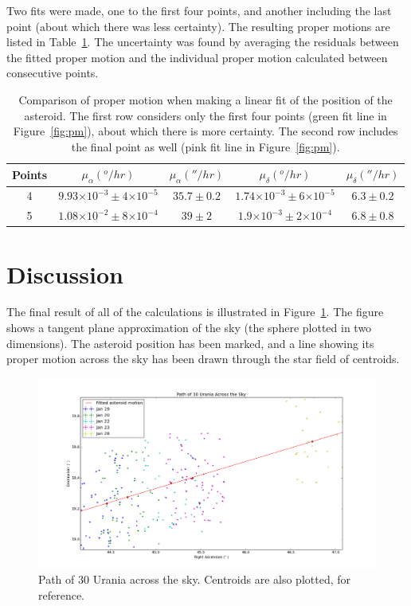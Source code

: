 \documentclass[a4paper,12pt]{article}
\providecommand{\e}[1]{\ensuremath{\times 10^{#1}}}
\begin{document}
Two fits were made, one to the first four points, and another including the last point (about which there was less certainty). The resulting proper motions are listed in Table~\ref{tab:pm}. The uncertainty was found by averaging the residuals between the fitted proper motion and the individual proper motion calculated between consecutive points.

\begin{center}
\begin{table}[!htbp]
  \centering
  \begin{tabular}{c||c||c||c||c}
  	Points & $\mu_{\alpha} (^o/hr)$ & $\mu_{\alpha} (''/hr)$ & $\mu_{\delta} (^o/hr)$ & $\mu_{\delta} (''/hr)$ \\
  	\hline
  	\hline
  	4 & $9.93\e{-3}\pm 4\e{-5}$ & $35.7\pm 0.2$ & $1.74\e{-3}\pm 6\e{-5}$& $6.3\pm 0.2$ \\
  	5 & $1.08\e{-2}\pm 8\e{-4}$ & $39\pm 2$ & $1.9\e{-3}\pm 2\e{-4}$ & $6.8\pm 0.8$ \\
   \end{tabular}
    \caption{Comparison of proper motion when making a linear fit of the position of the asteroid. The first row considers only the first four points (green fit line in Figure~\ref{fig:pm}), about which there is more certainty. The second row includes the final point as well (pink fit line in Figure~\ref{fig:pm}).}
    \label{tab:pm}
\end{table}
\end{center}




\section{Discussion}
\label{sec:discussion}

The final result of all of the calculations is illustrated in Figure~\ref{fig:path}. The figure shows a tangent plane approximation of the sky (the sphere plotted in two dimensions). The asteroid position has been marked, and a line showing its proper motion across the sky has been drawn through the star field of centroids.

\begin{figure}[!htbp]
\centering
\includegraphics[width = \linewidth]{path_urania.png}
\caption{Path of 30 Urania across the sky. Centroids are also plotted, for reference.}
\label{fig:path}
\end{figure}
\end{document}
